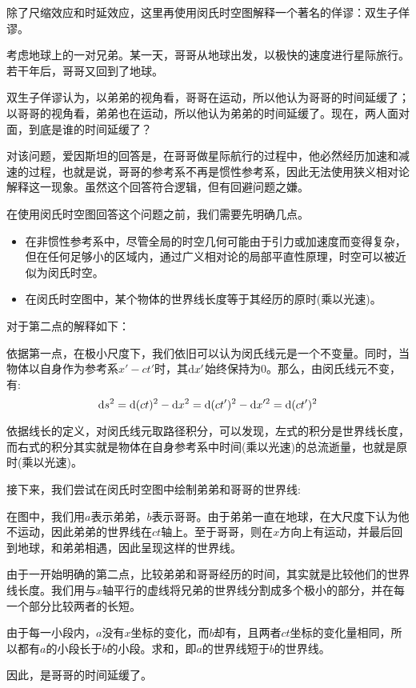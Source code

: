 除了尺缩效应和时延效应，这里再使用闵氏时空图解释一个著名的佯谬：双生子佯谬。

\begin{ex}[双生子佯谬]
    考虑地球上的一对兄弟。某一天，哥哥从地球出发，以极快的速度进行星际旅行。若干年后，哥哥又回到了地球。

    双生子佯谬认为，以弟弟的视角看，哥哥在运动，所以他认为哥哥的时间延缓了；以哥哥的视角看，弟弟也在运动，所以他认为弟弟的时间延缓了。现在，两人面对面，到底是谁的时间延缓了？
\end{ex}
\begin{so}[双生子佯谬]
    对该问题，爱因斯坦的回答是，在哥哥做星际航行的过程中，他必然经历加速和减速的过程，也就是说，哥哥的参考系不再是惯性参考系，因此无法使用狭义相对论解释这一现象。虽然这个回答符合逻辑，但有回避问题之嫌。

    在使用闵氏时空图回答这个问题之前，我们需要先明确几点。
    \begin{itemize}
        \item 在非惯性参考系中，尽管全局的时空几何可能由于引力或加速度而变得复杂，但在任何足够小的区域内，通过广义相对论的局部平直性原理，时空可以被近似为闵氏时空。
        \item 在闵氏时空图中，某个物体的世界线长度等于其经历的原时(乘以光速)。
    \end{itemize}

    对于第二点的解释如下：

    依据第一点，在极小尺度下，我们依旧可以认为闵氏线元是一个不变量。同时，当物体以自身作为参考系$x'-ct'$时，其$\dif x'$始终保持为$0$。那么，由闵氏线元不变，有:
    \begin{equation}
        \dif s^2=\dif(ct)^2-\dif x^2 = \dif (ct')^2-\dif x'^2 = \dif(ct')^2
    \end{equation}

    依据线长的定义，对闵氏线元取路径积分，可以发现，左式的积分是世界线长度，而右式的积分其实就是物体在自身参考系中时间(乘以光速)的总流逝量，也就是原时(乘以光速)。

    接下来，我们尝试在闵氏时空图中绘制弟弟和哥哥的世界线:

    在图中，我们用$a$表示弟弟，$b$表示哥哥。由于弟弟一直在地球，在大尺度下认为他不运动，因此弟弟的世界线在$ct$轴上。至于哥哥，则在$x$方向上有运动，并最后回到地球，和弟弟相遇，因此呈现这样的世界线。

    由于一开始明确的第二点，比较弟弟和哥哥经历的时间，其实就是比较他们的世界线长度。我们用与$x$轴平行的虚线将兄弟的世界线分割成多个极小的部分，并在每一个部分比较两者的长短。

    由于每一小段内，$a$没有$x$坐标的变化，而$b$却有，且两者$ct$坐标的变化量相同，所以都有$a$的小段长于$b$的小段。求和，即$a$的世界线短于$b$的世界线。

    因此，是哥哥的时间延缓了。
\end{so}
